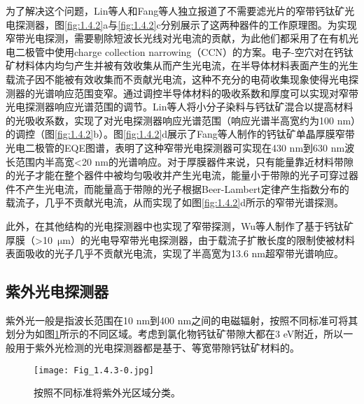 \documentclass[forlib]{WHUMaster}   %
\begin{document}
{为了解决这个问题，Lin等人\cite{RN153}和Fang等人\cite{RN130}独立报道了不需要滤光片的窄带钙钛矿光电探测器，图\ref{fig:1.4.2}a与\ref{fig:1.4.2}c分别展示了这两种器件的工作原理图。为实现窄带光电探测，需要剔除短波长光线对光电流的贡献，为此他们都采用了在有机光电二极管中使用charge collection narrowing（CCN）的方案\cite{RN154}。电子-空穴对在钙钛矿材料体内均匀产生并被有效收集从而产生光电流，在半导体材料表面产生的光生载流子因不能被有效收集而不贡献光电流，这种不充分的电荷收集现象使得光电探测器的光谱响应范围变窄。通过调控半导体材料的吸收系数和厚度可以实现对窄带光电探测器响应光谱范围的调节。Lin等人将小分子染料与钙钛矿混合以提高材料的光吸收系数，实现了对光电探测器响应光谱范围（响应光谱半高宽约为100 nm）的调控（图\ref{fig:1.4.2}b）。图\ref{fig:1.4.2}d展示了Fang等人制作的钙钛矿单晶厚膜窄带光电二极管的EQE图谱，表明了这种窄带光电探测器可实现在430 nm到630 nm波长范围内半高宽<20 nm的光谱响应。对于厚膜器件来说，只有能量靠近材料带隙的光子才能在整个器件中被均匀吸收并产生光电流，能量小于带隙的光子可穿过器件不产生光电流，而能量高于带隙的光子根据Beer-Lambert定律产生指数分布的载流子，几乎不贡献光电流，从而实现了如图\ref{fig:1.4.2}d所示的窄带光谱探测。

此外，在其他结构的光电探测器中也实现了窄带探测，Wu等人制作了基于钙钛矿厚膜（>10\ $\si{\um}$）的光电导窄带光电探测器，由于载流子扩散长度的限制使被材料表面吸收的光子几乎不贡献光电流，实现了半高宽为13.6 nm超窄带光谱响应\cite{RN155}。

\subsection{紫外光电探测器}

紫外光一般是指波长范围在10 nm到400 nm之间的电磁辐射，按照不同标准可将其划分为如图\ref{fig:1.4.3.0}所示的不同区域\cite{RN175}。考虑到氯化物钙钛矿带隙大都在3 eV附近，所以一般用于紫外光检测的光电探测器都是基于、等宽带隙钙钛矿材料的。

\begin{figure}[ht]
\centering
  \texttt{[image: Fig\_1.4.3-0.jpg]}
  \caption{\rm 按照不同标准将紫外光区域分类\cite{RN175}。}
  \label{fig:1.4.3.0}
\end{figure}

}
\end{document}
